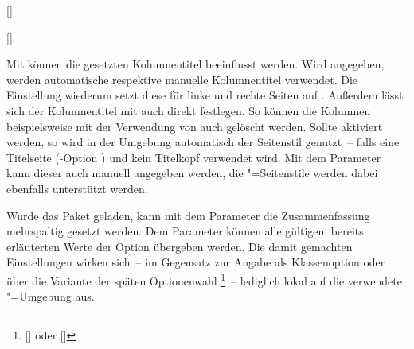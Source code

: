 \begin{Declaration*}{}
\begin{Declaration*}{}
\begin{Declaration*}{}
\begin{Declaration}{[]}
\begin{Declaration}{[]}
\begin{Declaration}{}
\begin{Declaration}[v2.02]{}
\begin{Declaration}[v2.02]{%
}
\begin{Declaration}{}
\begin{Declaration}{}{%
}
Mit  können die gesetzten Kolumnentitel 
beeinflusst werden. Wird  
angegeben, werden automatische respektive manuelle Kolumnentitel verwendet. Die 
Einstellung  wiederum setzt diese 
für linke und rechte Seiten auf . Außerdem lässt sich der 
Kolumnentitel mit  
auch direkt festlegen. So können die Kolumnen beispielsweise mit der Verwendung 
von  auch gelöscht werden. 
Sollte  aktiviert werden, so wird in der
Umgebung automatisch der Seitenstil  genutzt~-- falls eine 
Titelseite (\KOMAScript-Option ) und kein Titelkopf 
verwendet wird. Mit dem Parameter  kann 
dieser auch manuell angegeben werden, die "=Seitenstile 
werden dabei ebenfalls unterstützt werden.

Wurde das Paket  geladen, kann mit dem Parameter 
 die Zusammenfassung 
mehrspaltig gesetzt werden. Dem Parameter  
können alle gültigen, bereits erläuterten Werte der Option  
übergeben werden. Die damit gemachten Einstellungen wirken sich~-- im Gegensatz 
zur Angabe als Klassenoption oder über die Variante der späten Optionenwahl%
\footnote{%
  [] oder
  []
}~-- lediglich lokal auf die verwendete "=Umgebung aus.


\end{Declaration}
\end{Declaration}
\end{Declaration}
\end{Declaration}
\end{Declaration}
\end{Declaration}
\end{Declaration}
\end{Declaration*}
\end{Declaration*}
\end{Declaration*}
